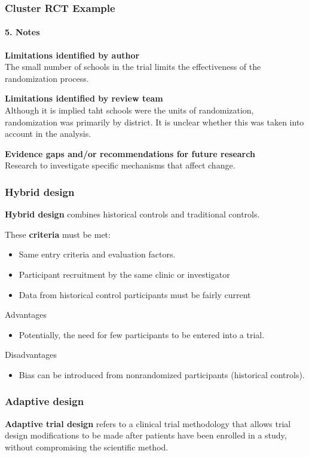 \documentclass[table,10pt]{beamer}
\begin{document}
\begin{CJK*}{UTF8}{gbsn}
\begin{frame}[t]
\frametitle{Cluster RCT Example}
\framesubtitle{5. Notes}
\footnotesize
\textbf{Limitations identified by author}\\
The small number of schools in the trial limits the effectiveness of the 
randomization process.

\textbf{Limitations identified by review team}\\
Although it is implied taht schools were the units of randomization, 
randomization was primarily by district. It is unclear whether this was 
taken into account in the analysis.

\textbf{Evidence gaps and/or recommendations for future research}\\
Research to investigate specific mechanisms that affect change.


\end{frame}

\begin{frame}[t]
\frametitle{Hybrid design}
\textbf{Hybrid design} combines historical controls and traditional controls.

These \textbf{criteria} must be met:
\begin{itemize}
	\item Same entry criteria and evaluation factors.
	\item Participant recruitment by the same clinic or investigator
	\item Data from historical control participants must be fairly current
\end{itemize}
\begin{alertblock}{Advantages}
\begin{itemize}
	\item Potentially, the need for few participants to be entered into a trial.
\end{itemize}
\end{alertblock}
\begin{alertblock}{Disadvantages}
\begin{itemize}
	\item Bias can be introduced from nonrandomized participants (historical controls).
\end{itemize}
\end{alertblock}
\end{frame}


\begin{frame}[t]
\frametitle{Adaptive design}
\textbf{Adaptive trial design} refers to a clinical trial methodology that allows trial design 
modifications to be made after patients have been enrolled in a study, without compromising the 
scientific method.


\end{frame}
\end{CJK*}
\end{document}
